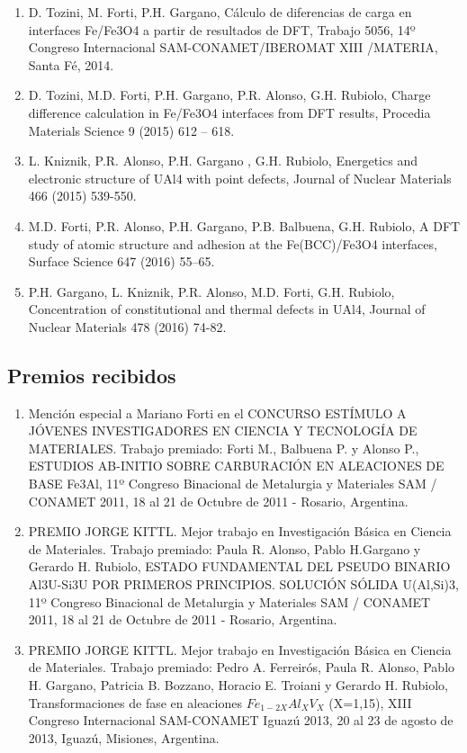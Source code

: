 \begin{enumerate}
\item  D. Tozini, M. Forti, P.H. Gargano, Cálculo de diferencias de carga en 
interfaces Fe/Fe3O4 a partir de resultados de DFT, Trabajo 5056, 14º Congreso 
Internacional SAM-CONAMET/IBEROMAT XIII /MATERIA, Santa Fé, 2014.

\item  D. Tozini, M.D. Forti, P.H. Gargano, P.R. Alonso, G.H. Rubiolo, 
Charge difference calculation in Fe/Fe3O4 interfaces from DFT results, Procedia 
Materials Science 9 (2015) 612 – 618.

\item L. Kniznik, P.R. Alonso, P.H. Gargano , G.H. Rubiolo, Energetics and 
electronic structure of UAl4 with point defects, Journal of Nuclear Materials 
466 (2015) 539-550.

\item M.D. Forti, P.R. Alonso, P.H. Gargano, P.B. Balbuena, G.H. Rubiolo, A 
DFT study of atomic structure and adhesion at the Fe(BCC)/Fe3O4 interfaces, 
Surface Science 647 (2016) 55–65.

\item  P.H. Gargano, L. Kniznik, P.R. Alonso, M.D. Forti, G.H. Rubiolo, 
Concentration of constitutional and thermal defects in UAl4, Journal of Nuclear 
Materials 478 (2016) 74-82.
\end{enumerate}

\subsection{ Premios recibidos }

\begin{enumerate} 

\item  Mención especial a Mariano Forti en el CONCURSO ESTÍMULO A JÓVENES 
INVESTIGADORES EN CIENCIA Y TECNOLOGÍA DE MATERIALES. Trabajo premiado: Forti 
M., Balbuena P. y Alonso P., ESTUDIOS AB-INITIO SOBRE CARBURACIÓN EN ALEACIONES 
DE BASE Fe3Al, 11º Congreso Binacional de Metalurgia y Materiales SAM / CONAMET 
2011, 18 al 21 de Octubre de 2011 - Rosario, Argentina.

\item  PREMIO JORGE KITTL. Mejor trabajo en Investigación Básica en Ciencia 
de Materiales. Trabajo premiado: Paula R. Alonso, Pablo H.Gargano y Gerardo H. 
Rubiolo, ESTADO FUNDAMENTAL DEL PSEUDO BINARIO Al3U-Si3U POR PRIMEROS 
PRINCIPIOS. SOLUCIÓN SÓLIDA U(Al,Si)3, 11º Congreso Binacional de Metalurgia y 
Materiales SAM / CONAMET 2011, 18 al 21 de Octubre de 2011 - Rosario, Argentina.

\item  PREMIO JORGE KITTL. Mejor trabajo en Investigación Básica en Ciencia 
de Materiales. Trabajo premiado: Pedro A. Ferreirós, Paula R. Alonso, Pablo H. 
Gargano, Patricia B. Bozzano, Horacio E. Troiani y Gerardo H. Rubiolo, 
    Transformaciones de fase en aleaciones $Fe_{1-2X}Al_X V_X$ (X=1,15), XIII Congreso 
Internacional SAM-CONAMET Iguazú 2013, 20 al 23 de agosto de 2013, Iguazú, 
Misiones, Argentina.

\end{enumerate}

